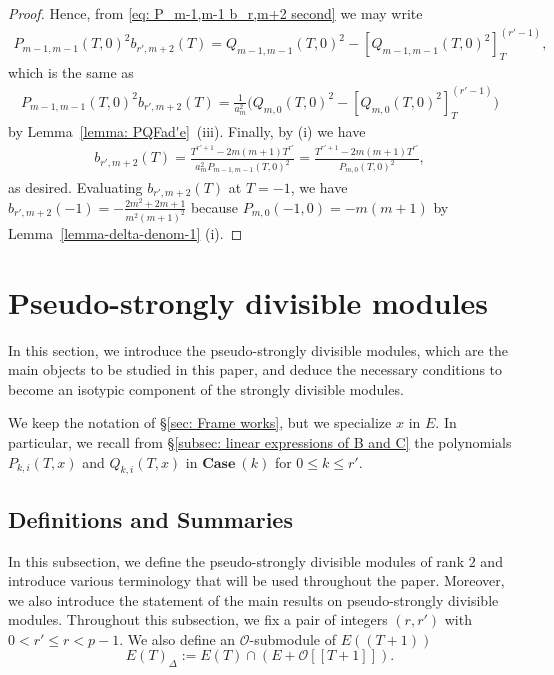 \documentclass[11pt]{amsart}
\theoremstyle{definition}
\numberwithin{equation}{subsection}
\theoremstyle{plain}
\theoremstyle{plain}
\theoremstyle{plain}
\theoremstyle{plain}
\theoremstyle{plain}
\theoremstyle{plain}
\theoremstyle{plain}
\theoremstyle{plain}
\theoremstyle{plain}
\theoremstyle{plain}
\theoremstyle{plain}
\theoremstyle{plain}
\theoremstyle{definition}
\theoremstyle{definition}
\theoremstyle{definition}
\theoremstyle{remark}
\renewcommand{\(}{\textup{(}}
\renewcommand{\)}{\textup{)}}
\newcommand{\cO}{\mathcal{O}}
\begin{document}
\begin{proof}
Hence, from \eqref{eq: P_m-1,m-1 b_r,m+2 second} we may write
\begin{align*}
    P_{m-1,m-1}(T,0)^2b_{r',m+2}(T)=Q_{m-1,m-1}(T,0)^2-[Q_{m-1,m-1}(T,0)^2]_{T}^{(r'-1)},
\end{align*}
which is the same as
    \begin{align*}
    P_{m-1,m-1}(T,0)^2b_{r',m+2}(T)=\frac{1}{a_m^2}\big(
        Q_{m,0}(T,0)^2-[Q_{m,0}(T,0)^2]_{T}^{(r'-1)}
        \big)
    \end{align*}
by Lemma~\ref{lemma: PQFad'e}~(iii). Finally, by (i) we have
    \begin{align*}
        b_{r',m+2}(T)
        =\frac{T^{r'+1}-2m(m+1)T^{r'}}{a_m^2P_{m-1,m-1}(T,0)^2}
        =\frac{T^{r'+1}-2m(m+1)T^{r'}}{P_{m,0}(T,0)^2},
    \end{align*}
as desired. Evaluating $b_{r',m+2}(T)$ at $T=-1$, we have $b_{r',m+2}(-1)=-\frac{2m^2+2m+1}{m^2(m+1)^2}$ because $P_{m,0}(-1,0)=-m(m+1)$ by Lemma~\ref{lemma-delta-denom-1} (i).
\end{proof}









\smallskip

\section{Pseudo-strongly divisible modules}\label{sec: pseudo strongly divisible modules}
In this section, we introduce the pseudo-strongly divisible modules, which are the main objects to be studied in this paper, and deduce the necessary conditions to become an isotypic component of the strongly divisible modules. 

We keep the notation of \S\ref{sec: Frame works}, but we specialize $x$ in $E$. In particular, we recall from \S\ref{subsec: linear expressions of B and C} the polynomials $P_{k,i}(T,x)$ and $Q_{k,i}(T,x)$ in $\mathbf{Case}~(k)$ for $0\leq k\leq r'$.





\subsection{Definitions and Summaries}\label{subsec: pseudo sdm}
In this subsection, we define the pseudo-strongly divisible modules of rank $2$ and introduce various terminology that will be used throughout the paper. Moreover, we also introduce the statement of the main results on pseudo-strongly divisible modules. Throughout this subsection, we fix a pair of integers $(r,r')$ with $0<r'\leq r<p-1$. We also define an $\cO$-submodule of $E((T+1))$
\begin{equation*}
    E(T)_\Delta:=E(T)\cap(E+\cO[[T+1]]).
\end{equation*}
\end{document}

